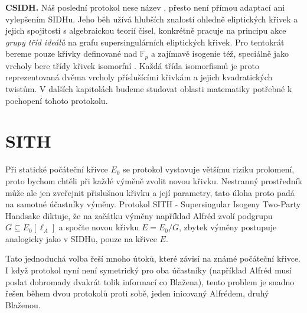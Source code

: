 \documentclass[12pt]{report}
\begin{document}
\textbf{CSIDH.} \cite{CSIDH} Náš poslední protokol nese název , přesto není přímou adaptací ani vylepšením SIDHu. Jeho běh užívá hlubších znalostí ohledně eliptických křivek a jejich spojitosti s algebraickou teorií čísel, konkrétně pracuje na principu akce \textit{grupy tříd ideálů} na grafu supersingulárních eliptických křivek. Pro tentokrát bereme pouze křivky definované nad $\mathbb{F}_p$ a zajímavě isogenie též, speciálně jako vrcholy bere třídy křivek isomorfní . Každá třída isomorfismů je proto reprezentovaná dvěma vrcholy příslušícími křivkám a jejich kvadratických twistům. V dalších kapitolách budeme studovat oblasti matematiky potřebné k pochopení tohoto protokolu.

\section{SITH}

Při statické počáteční křivce $E_0$ se protokol vystavuje většímu riziku prolomení, proto bychom chtěli při každé výměně zvolit novou křivku. Nestranný prostředník může ale jen zveřejnit přislušnou křivku a její parametry, tato úloha proto padá na samotné účastníky výměny. Protokol SITH - Supersingular Isogeny Two-Party Handsake diktuje, že na začátku výměny například Alfréd zvolí podgrupu $G \subseteq E_0 [\ell_A]$ a spočte novou křivku $E = E_0/G$, zbytek výměny postupuje analogicky jako v SIDHu, pouze na křivce $E$.

\begin{figure}[h]
\begin{center} 
\end{center}
\end{figure}

Tato jednoduchá volba řeší mnoho útoků, které závisí na známé počáteční křivce. I když protokol nyní není symetrický pro oba účastníky (například Alfréd musí poslat dohromady dvakrát tolik informací co Blažena), tento problem je snadno řešen během dvou protokolů proti sobě, jeden inicovaný Alfrédem, druhý Blaženou. 
\end{document}
